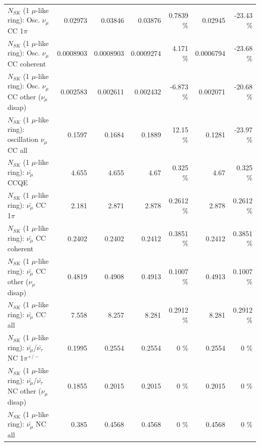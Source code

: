 \begin{table}
\begin{tabular}{| l | r | r | r  r | r  r |}
                          $N_{SK}$ (1 $\mu$-like ring): Osc. $\nu_\mu$ CC 1$\pi$ &         0.02973 &         0.03846 &         0.03876 &   0.7839 \%  &         0.02945 &   -23.43 \%  \\ 
                        $N_{SK}$ (1 $\mu$-like ring): Osc. $\nu_\mu$ CC coherent &       0.0008903 &       0.0008903 &       0.0009274 &    4.171 \%  &       0.0006794 &   -23.68 \%  \\ 
         $N_{SK}$ (1 $\mu$-like ring): Osc. $\nu_\mu$ CC other ($\nu_\mu$ disap) &        0.002583 &        0.002611 &        0.002432 &   -6.873 \%  &        0.002071 &   -20.68 \%  \\ 
                      $N_{SK}$ (1 $\mu$-like ring): oscillation $\nu_\mu$ CC all &          0.1597 &          0.1684 &          0.1889 &    12.15 \%  &          0.1281 &   -23.97 \%  \\ 
\hline
\hline
                              $N_{SK}$ (1 $\mu$-like ring): $\bar{\nu_\mu}$ CCQE &           4.655 &           4.655 &            4.67 &    0.325 \%  &            4.67 &    0.325 \%  \\ 
                         $N_{SK}$ (1 $\mu$-like ring): $\bar{\nu_\mu}$ CC 1$\pi$ &           2.181 &           2.871 &           2.878 &   0.2612 \%  &           2.878 &   0.2612 \%  \\ 
                       $N_{SK}$ (1 $\mu$-like ring): $\bar{\nu_\mu}$ CC coherent &          0.2402 &          0.2402 &          0.2412 &   0.3851 \%  &          0.2412 &   0.3851 \%  \\ 
        $N_{SK}$ (1 $\mu$-like ring): $\bar{\nu_\mu}$ CC other ($\nu_\mu$ disap) &          0.4819 &          0.4908 &          0.4913 &   0.1007 \%  &          0.4913 &   0.1007 \%  \\ 
                          $N_{SK}$ (1 $\mu$-like ring): $\bar{\nu_{\mu}}$ CC all &           7.558 &           8.257 &           8.281 &   0.2912 \%  &           8.281 &   0.2912 \%  \\ 
\hline
  $N_{SK}$ (1 $\mu$-like ring): $\bar{\nu_\mu}$/$\bar{\nu_\tau}$ NC 1$\pi^{+/-}$ &          0.1995 &          0.2554 &          0.2554 &        0 \%  &          0.2554 &        0 \%  \\ 
$N_{SK}$ (1 $\mu$-like ring): $\bar{\nu_\mu}$/$\bar{\nu_\tau}$ NC other ($\nu_\mu$ disap) &          0.1855 &          0.2015 &          0.2015 &        0 \%  &          0.2015 &        0 \%  \\ 
                          $N_{SK}$ (1 $\mu$-like ring): $\bar{\nu_{\mu}}$ NC all &           0.385 &          0.4568 &          0.4568 &        0 \%  &          0.4568 &        0 \%  \\ 

\end{tabular}
\end{table}

